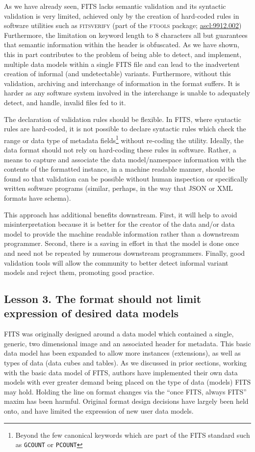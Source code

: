 \documentclass[final,authoryear,5p,times,twocolumn]{elsarticle}
\begin{document}
{{As we have already seen, FITS lacks semantic validation and its
syntactic validation is very limited, achieved only by the creation
of hard-coded rules in software utilities such as \textsc{fitsverify}
(part of the \textsc{ftools} package; \href{http://ascl.net/9912.002}{ascl:9912.002})
Furthermore, the limitation on
keyword length to 8 characters all but guarantees that semantic
information within the header is obfuscated. As we have shown,
this in part contributes to the problem of being able to detect,
and implement, multiple data models within a single FITS file
and can lead to the inadvertent creation of informal (and
undetectable) variants. Furthermore, without this validation,
archiving and interchange of information in the format suffers.
It is harder as any software system involved in the interchange
is unable to adequately detect, and handle, invalid files fed to
it.

The declaration of validation rules should be flexible. In FITS,
where syntactic rules are hard-coded, it is not possible to
declare syntactic rules which check the range or data type of
metadata fields\footnote{Beyond the few canonical keywords
which are part of the FITS standard such as \texttt{GCOUNT} 
or \texttt{PCOUNT}} without re-coding the utility.
Ideally, the data format should not rely on hard-coding these rules
in software. Rather, a means to capture and associate the data
model/namespace information with the contents of the formatted
instance, in a machine readable manner, should be found so that
validation can be possible without human inspection or specifically
written software programs (similar, perhaps, in the way that JSON
or XML formats have schema).


This approach has additional benefits downstream. First, it will help 
to avoid misinterpretation because it is better for the creator
of the data and/or data model to provide the machine readable information rather
than a downstream programmer. Second, there is a saving in effort
in that the model is done once and need not be repeated by numerous
downstream programmers. Finally, good validation tools will allow the community
to better detect informal variant models and reject them, promoting good
practice.


\subsection{Lesson 3. The format should not limit expression of desired data models}

FITS was originally designed around a data model which contained a single, generic, 
two dimensional image and an associated header for metadata. This basic data model
has been expanded to allow more instances (extensions), as well as types of data 
(data cubes and tables). 
As we discussed in prior sections, working with the basic data model of FITS,
authors have implemented their own data models with ever greater demand being
placed on the type of data (models) FITS may hold.
Holding the line on format changes via the ``once FITS, always FITS'' maxim 
has been harmful.  Original format design decisions have largely been held onto, 
and have limited the expression of new user data models. 


}}
\end{document}
